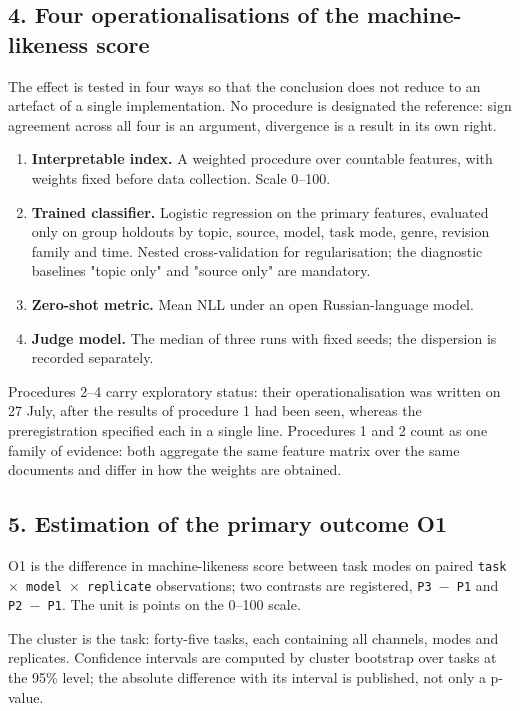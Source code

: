 \documentclass[11pt,a4paper]{article}
\renewcommand{\_}{\textunderscore\allowbreak}
\begin{document}
\subsection{4. Four operationalisations of the machine-likeness score}

The effect is tested in four ways so that the conclusion does not reduce to an
artefact of a single implementation. No procedure is designated the reference:
sign agreement across all four is an argument, divergence is a result in its own
right.

\begin{enumerate}
\item[1.] \textbf{Interpretable index.} A weighted procedure over countable features, with
   weights fixed before data collection. Scale 0–100.
\item[2.] \textbf{Trained classifier.} Logistic regression on the primary features, evaluated
   only on group holdouts by topic, source, model, task mode, genre, revision
   family and time. Nested cross-validation for regularisation; the diagnostic
   baselines "topic only" and "source only" are mandatory.
\item[3.] \textbf{Zero-shot metric.} Mean NLL under an open Russian-language model.
\item[4.] \textbf{Judge model.} The median of three runs with fixed seeds; the dispersion is
   recorded separately.
\end{enumerate}

Procedures 2–4 carry exploratory status: their operationalisation was written on
27 July, after the results of procedure 1 had been seen, whereas the
preregistration specified each in a single line. Procedures 1 and 2 count as one
family of evidence: both aggregate the same feature matrix over the same documents
and differ in how the weights are obtained.

\subsection{5. Estimation of the primary outcome O1}

O1 is the difference in machine-likeness score between task modes on paired
\texttt{task $\times$ model $\times$ replicate} observations; two contrasts are registered, \texttt{P3 $-$ P1}
and \texttt{P2 $-$ P1}. The unit is points on the 0–100 scale.

The cluster is the task: forty-five tasks, each containing all channels, modes and
replicates. Confidence intervals are computed by cluster bootstrap over tasks
at the 95\% level; the absolute difference with its interval is published,
not only a p-value.
\end{document}
